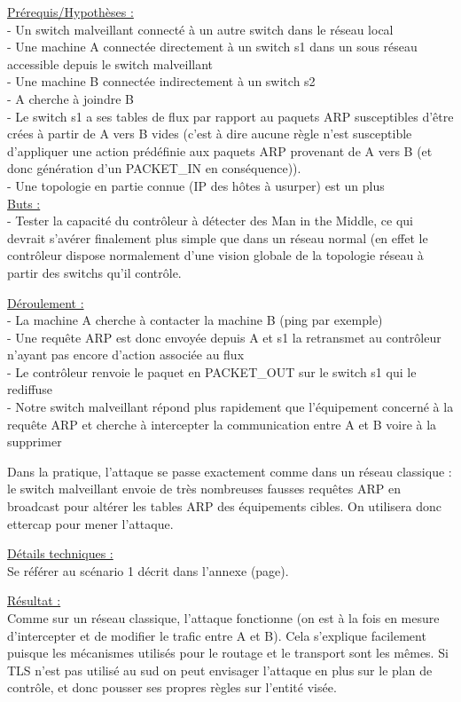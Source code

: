 \underline{Prérequis/Hypothèses :}\\
- Un switch malveillant connecté à un autre switch dans le réseau local\\
- Une machine A connectée directement à un switch s1 dans un sous réseau accessible depuis le switch malveillant\\
- Une machine B connectée indirectement à un switch s2\\
- A cherche à joindre B\\
- Le switch s1 a ses tables de flux par rapport au paquets ARP susceptibles d’être crées à partir de A vers B vides (c’est à dire aucune règle n’est susceptible d’appliquer une action prédéfinie aux paquets ARP provenant de A vers B (et donc génération d’un PACKET\_IN en conséquence)).\\
- Une topologie en partie connue (IP des hôtes à usurper) est un plus\\


\underline{Buts :}\\
- Tester la capacité du contrôleur à détecter des Man in the Middle, ce qui devrait s’avérer finalement plus simple que dans un réseau normal (en effet le contrôleur dispose normalement d’une vision globale de la topologie réseau à partir des switchs qu’il contrôle.

\underline{Déroulement :}\\
- La machine A cherche à contacter la machine B (ping par exemple)\\
- Une requête ARP est donc envoyée depuis A et s1 la retransmet au contrôleur n’ayant pas encore d’action associée au flux\\
- Le contrôleur renvoie le paquet en PACKET\_OUT sur le switch s1 qui le rediffuse\\
- Notre switch malveillant répond plus rapidement que l’équipement concerné à la requête ARP et cherche à intercepter la communication entre A et B voire à la supprimer

Dans la pratique, l'attaque se passe exactement comme dans un réseau classique : le switch malveillant envoie de très nombreuses fausses requêtes ARP en broadcast pour altérer les tables ARP des équipements cibles. On utilisera donc ettercap pour mener l'attaque.

\underline{Détails techniques :}\\
Se référer au scénario 1 décrit dans l'annexe (page).

\underline{Résultat :}\\
Comme sur un réseau classique, l'attaque fonctionne (on est à la fois en mesure d'intercepter et de modifier le trafic entre A et B). Cela s'explique facilement puisque les mécanismes utilisés pour le routage et le transport sont les mêmes. Si TLS n'est pas utilisé au sud on peut envisager l'attaque en plus sur le plan de contrôle, et donc pousser ses propres règles sur l'entité visée.

